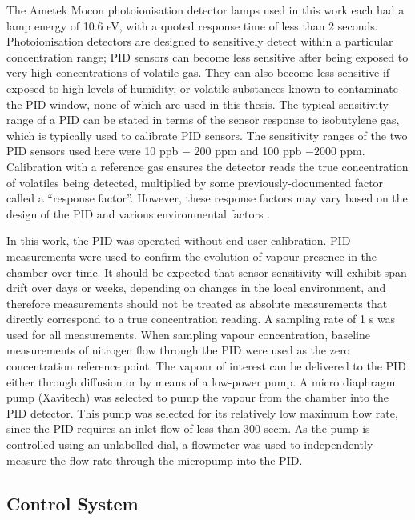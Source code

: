 \documentclass[
  a4paper,
]{scrbook}
\begin{document}
The Ametek Mocon photoionisation detector lamps used in this work each
had a lamp energy of 10.6 eV, with a quoted response time of less than 2
seconds. Photoionisation detectors are designed to sensitively detect
within a particular concentration range; PID sensors can become less
sensitive after being exposed to very high concentrations of volatile
gas. They can also become less sensitive if exposed to high levels of
humidity, or volatile substances known to contaminate the PID window,
none of which are used in this thesis. The typical sensitivity range of
a PID can be stated in terms of the sensor response to isobutylene gas,
which is typically used to calibrate PID sensors. The sensitivity ranges
of the two PID sensors used here were 10 ppb \(-\) 200 ppm and 100 ppb
\(- 2000\) ppm. Calibration with a reference gas ensures the detector
reads the true concentration of volatiles being detected, multiplied by
some previously-documented factor called a ``response factor''. However,
these response factors may vary based on the design of the PID and
various environmental factors \autocite{Ionscience,PIDmanual}.

In this work, the PID was operated without end-user calibration. PID
measurements were used to confirm the evolution of vapour presence in
the chamber over time. It should be expected that sensor sensitivity
will exhibit span drift over days or weeks, depending on changes in the
local environment, and therefore measurements should not be treated as
absolute measurements that directly correspond to a true concentration
reading. A sampling rate of 1 s was used for all measurements. When
sampling vapour concentration, baseline measurements of nitrogen flow
through the PID were used as the zero concentration reference point. The
vapour of interest can be delivered to the PID either through diffusion
or by means of a low-power pump. A micro diaphragm pump (Xavitech) was
selected to pump the vapour from the chamber into the PID detector. This
pump was selected for its relatively low maximum flow rate, since the
PID requires an inlet flow of less than 300 sccm. As the pump is
controlled using an unlabelled dial, a flowmeter was used to
independently measure the flow rate through the micropump into the PID.

\hypertarget{sec-control-system}{%
\subsection{Control System}\label{sec-control-system}}
\end{document}
